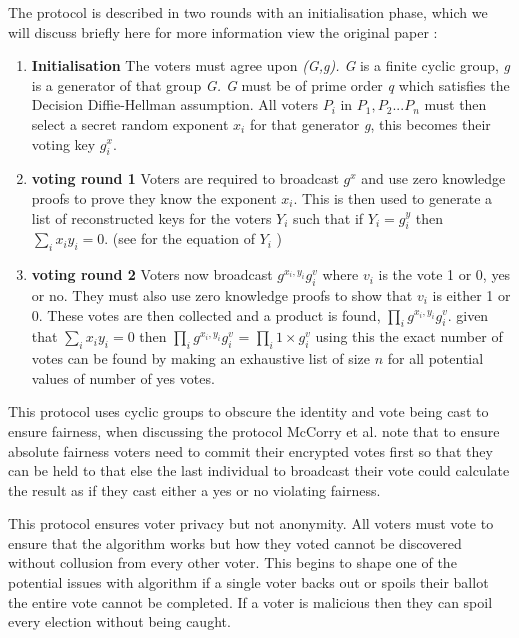 \documentclass{llncs}
\begin{document}
The protocol is described in two rounds with an initialisation phase, which we will discuss briefly here for more information view the original paper \cite{boardroom2017ncl}:
\begin{enumerate}
    \item \textbf{Initialisation} The voters must agree upon \textit{(G,g). G} is a finite cyclic group, \textit{g} is a generator of that group \textit{G. G} must be of prime order \textit{q} which satisfies the Decision Diffie-Hellman assumption. All voters \(P_i\) in \(P_1 , P_2 ... P_n\) must then select a secret random exponent \(x_i\) for that generator \textit{g}, this becomes their voting key \(g^x_i\).
    \item \textbf{voting round 1} Voters are required to broadcast \(g^x\) and use zero knowledge proofs \cite{goldreich1994definitions} to prove they know the exponent \(x_i\). This is then used to generate a list of reconstructed keys for the voters \(Y_i\) such that if \(Y_i = g^y_i\) then \(\sum_i x_i y_i= 0\). (see \cite{boardroom2017ncl} for the equation of \(Y_i\) )
    \item \textbf{voting round 2} Voters now broadcast \(g^{x_i,y_i} g^v_i\) where \(v_i\) is the vote 1 or 0, yes or no. They must also use zero knowledge proofs to show that \(v_i\) is either 1 or 0. These votes are then collected and a product is found, \(\prod_i g^{x_i,y_i} g^v_i\). 
    given that \(\sum_i x_i y_i= 0\) then \(\prod_i g^{x_i,y_i} g^v_i\) = \(\prod_i 1 \times g^v_i\) using this the exact number of votes can be found by making an exhaustive list of size \(n\) for all potential values of number of yes votes.
\end{enumerate}

This protocol uses cyclic groups to obscure the identity and vote being cast to ensure fairness, when discussing the protocol McCorry et al. note that to ensure absolute fairness voters need to commit their encrypted votes first so that they can be held to that else the last individual to broadcast their vote could calculate the result as if they cast either a yes or no violating fairness.

This protocol ensures voter privacy but not anonymity. All voters must vote to ensure that the algorithm works but how they voted cannot be discovered without collusion from every other voter. This begins to shape one of the potential issues with algorithm if a single voter backs out or spoils their ballot the entire vote cannot be completed. If a voter is malicious then they can spoil every election without being caught.
\end{document}
